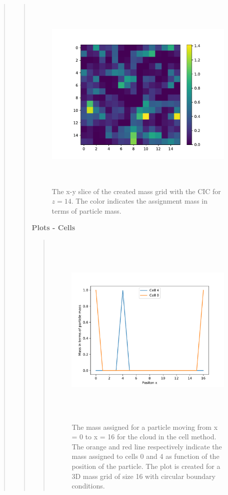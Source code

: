 \begin{quote}
\begin{quote}
\begin{figure}[!ht]
\centering
\includegraphics[width=14cm, height=9.5cm]{./Plots/5c_slice_14.pdf}
\caption{The x-y slice of the created mass grid with the CIC for $z = 14$. The color indicates the assignment mass in terms of particle mass. }
\end{figure}
\newpage

\textbf{Plots - Cells}
\begin{quote}
\begin{figure}[!ht]
\centering
\includegraphics[width=14cm, height=9.5cm]{./Plots/5c_cell.pdf}
\caption{The mass assigned for a particle moving from x = 0 to x = 16 for the cloud in the cell method. The orange and red line respectively indicate the mass assigned to cells 0 and 4 as function of the position of the particle. The plot is created for a 3D  mass grid of size 16 with circular boundary conditions.  }
\end{figure}

\end{quote}
\end{quote}
\end{quote}











